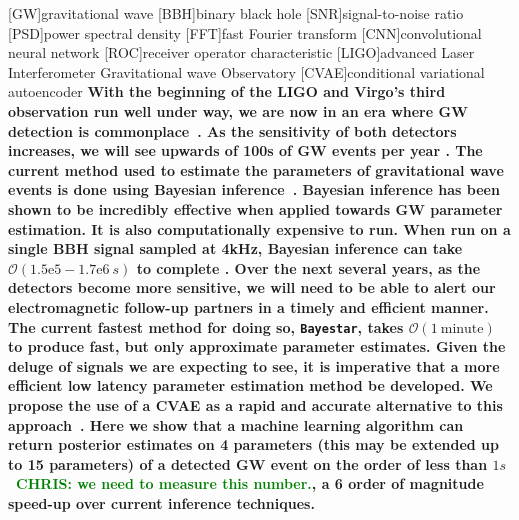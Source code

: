 \documentclass[%
showpacs,
 amsmath,amssymb,
 aps,
 twocolumn,
 prl,
 reprint,
floatfix,
]{revtex4-1}
\newcommand{\chris}[1]{\textbf{\textcolor{green}{CHRIS: #1}}}
\begin{document}
[GW]{gravitational wave}
[BBH]{binary black hole}
[SNR]{signal-to-noise ratio}
[PSD]{power spectral density}
[FFT]{fast Fourier transform}
[CNN]{convolutional neural network}
[ROC]{receiver operator characteristic}
[LIGO]{advanced Laser Interferometer Gravitational wave Observatory}
[CVAE]{conditional variational autoencoder}
%
%
%
\textbf{ 
%
%
With the beginning of the \ac{LIGO} and
Virgo's third observation run well under way, we are now in an era where
\ac{GW} detection is commonplace~\cite{PhysRevLett.116.061102,
PhysRevX.6.041015,PhysRevLett.119.161101}. As the sensitivity of both detectors
increases, we will see upwards of 100s of \ac{GW} events per year \cite{1409.7215}.  The current
method used to estimate the parameters of gravitational wave events is done
using Bayesian inference~\cite{1409.7215}.
%
%
Bayesian inference has been shown to be incredibly effective when 
applied towards \ac{GW} parameter estimation. It is also computationally expensive 
to run. When run on a single \ac{BBH} signal sampled at 4kHz, Bayesian 
inference can take $\mathcal{O}(1.5\textrm{e}5 - 1.7\textrm{e}6\: s)$ to complete \cite{1409.7215}. 
Over the next several years, as the detectors become more sensitive, we will 
need to be able to alert our electromagnetic follow-up partners in a timely 
and efficient manner. The current fastest method for doing so, \texttt{Bayestar}, 
takes $\mathcal{O}(1\: \textrm{minute})$ to produce fast, but only approximate parameter estimates. 
Given the deluge of signals we are expecting to see, 
it is imperative that a more efficient low latency parameter estimation 
method be developed. We propose the use of a \ac{CVAE} as a rapid and accurate alternative to this
approach~\cite{1904.06264,1812.04405}. 
%
%
Here we show that a machine learning algorithm can return
posterior estimates on 4 parameters (this may be extended up to 15 parameters) of a detected \ac{GW} event on the order of less
than $1s$~\chris{we need to measure this number.}, a 6 order of magnitude speed-up over
current inference techniques.}
\end{document}
